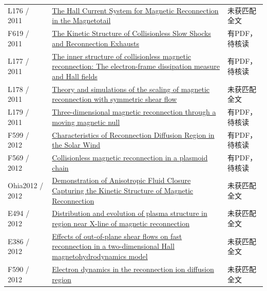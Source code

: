 \documentclass[UTF8,a4paper,11pt,openany,fontset=fandol]{ctexbook}
\begin{document}
\begin{longtable}{P{24mm}P{97mm}P{27mm}}
L176 / 2011 & \href{https://doi.org/10.1029/156gm18}{The Hall Current System for Magnetic Reconnection in the Magnetotail} & 未获匹配全文\\

F619 / 2011 & \href{http://hdl.handle.net/1903/11865}{The Kinetic Structure of Collisionless Slow Shocks and Reconnection Exhausts} & 有PDF，待核读\\

L177 / 2011 & \href{https://doi.org/10.1063/1.3662430}{The inner structure of collisionless magnetic reconnection: The electron-frame dissipation measure and Hall fields} & 有PDF，待核读\\

L178 / 2011 & \href{https://doi.org/10.1063/1.3602859}{Theory and simulations of the scaling of magnetic reconnection with symmetric shear flow} & 未获匹配全文\\

L179 / 2011 & \href{https://doi.org/10.5194/npg-18-871-2011}{Three-dimensional magnetic reconnection through a moving magnetic null} & 有PDF，待核读\\

F599 / 2012 & \href{https://doi.org/10.11728/cjss2012.06.778}{Characteristics of Reconnection Diffusion Region in the Solar Wind} & 有PDF，待核读\\

F569 / 2012 & \href{https://doi.org/10.5194/npg-19-145-2012}{Collisionless magnetic reconnection in a plasmoid chain} & 有PDF，待核读\\

Ohia2012 / 2012 & \href{https://doi.org/10.1103/PhysRevLett.109.115004}{Demonstration of Anisotropic Fluid Closure Capturing the Kinetic Structure of Magnetic Reconnection} & 未获匹配全文\\

E494 / 2012 & \href{http://en.cnki.com.cn/Article_en/CJFDTOTAL-NCDL201203012.htm}{Distribution and evolution of plasma structure in region near X-line of magnetic reconnection} & 未获匹配全文\\

E386 / 2012 & \href{https://doi.org/10.1063/1.3697561}{Effects of out-of-plane shear flows on fast reconnection in a two-dimensional Hall magnetohydrodynamics model} & 未获匹配全文\\

F590 / 2012 & \href{https://doi.org/10.1029/2012ja017896}{Electron dynamics in the reconnection ion diffusion region} & 未获匹配全文\\


\end{longtable}
\end{document}
